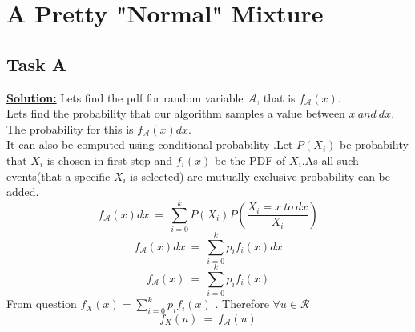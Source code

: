 \documentclass[12pt]{article}
\begin{document}
\section{A Pretty "Normal" Mixture}

\subsection{Task A}
\textbf{\underline{Solution:}}
Lets find the pdf for random variable $\mathcal{A}$, that is $f_{\mathcal{A}}(x)$. \\
Lets find the probability that our algorithm samples a value between $x\ and\ dx$. \\
The probability for this is $f_{\mathcal{A}}(x)dx$. \\ 
It can also be computed using conditional probability .Let $P(X_{i})$ be probability that $X_i$ is chosen in first step and $f_{i}(x)$ be the PDF of $X_{i}$.As all such events(that a specific $X_i$ is selected) are mutually exclusive probability can be added. \\
\[f_{\mathcal{A}}(x)dx\ =\ \sum_{i=0}^{k}P(X_{i})P\left(\frac{X_{i}=x\ to\ dx}{X_{i}}\right)\]
\[f_{\mathcal{A}}(x)dx\ =\ \sum_{i=0}^{k}p_{i}f_{i}(x)dx\]
\[f_{\mathcal{A}}(x)\ =\ \sum_{i=0}^{k}p_{i}f_{i}(x)\]
From question $f_{X}(x)=\sum_{i=0}^{k}p_{i}f_{i}(x)$ . Therefore $\forall u \in \mathcal{R}$ 
\begin{equation}
    f_{X}(u)\ =\ f_{\mathcal{A}}(u)
\end{equation}
\end{document}

